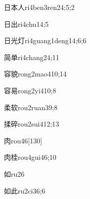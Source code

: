 \begin{verbete}{日本人}{ri4ben3ren2}{4;5;2}
\end{verbete}

\begin{verbete}{日出}{ri4chu1}{4;5}
\end{verbete}

\begin{verbete}{日光灯}{ri4guang1deng1}{4;6;6}
\end{verbete}

\begin{verbete}{简单}{ri4chang2}{4;11}
\end{verbete}

\begin{verbete}{容貌}{rong2mao4}{10;14}
\end{verbete}

\begin{verbete}{容易}{rong2yi4}{10;8}
\end{verbete}

\begin{verbete}{柔软}{rou2ruan3}{9;8}
\end{verbete}

\begin{verbete}{揉碎}{rou2sui4}{12;13}
\end{verbete}

\begin{verbete}{肉}{rou4}{6}[130]
\end{verbete}

\begin{verbete}{肉桂}{rou4gui4}{6;10}
\end{verbete}

\begin{verbete}{如}{ru2}{6}
\end{verbete}

\begin{verbete}{如此}{ru2ci3}{6;6}
\end{verbete}


